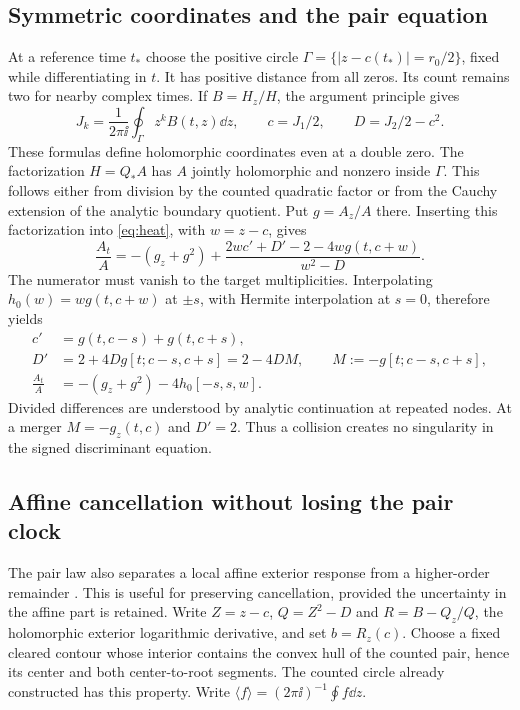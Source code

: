 \subsection{Symmetric coordinates and the pair equation}

At a reference time $t_*$ choose the positive circle
$\Gamma=\{|z-c(t_*)|=r_0/2\}$, fixed while differentiating in $t$.
It has positive distance from all zeros. Its count remains two for
nearby complex times. If $B=H_z/H$, the argument principle gives
\begin{equation}
 J_k=\frac1{2\pi\ii}\oint_\Gamma z^kB(t,z)\dd z,
 \qquad c=J_1/2,\qquad D=J_2/2-c^2.
 \label{eq:coordinates}
\end{equation}
These formulas define holomorphic coordinates even at a double zero.
The factorization $H=Q_*A$ has $A$ jointly holomorphic and nonzero
inside $\Gamma$. This follows either from division by the counted
quadratic factor or from the Cauchy extension of the analytic boundary
quotient. Put $g=A_z/A$ there. Inserting this factorization into
\eqref{eq:heat}, with $w=z-c$, gives
\begin{equation}
 \frac{A_t}{A}=-(g_z+g^2)
       +\frac{2wc'+D'-2-4wg(t,c+w)}{w^2-D}.
 \label{eq:deflated}
\end{equation}
The numerator must vanish to the target multiplicities. Interpolating
$h_0(w)=wg(t,c+w)$ at $\pm s$, with Hermite interpolation at $s=0$,
therefore yields
\begin{equation}
 \begin{split}
 c'&=g(t,c-s)+g(t,c+s),\\
 D'&=2+4Dg[t;c-s,c+s]=2-4DM,\qquad
 M:=-g[t;c-s,c+s],\\
 \frac{A_t}{A}&=-(g_z+g^2)-4h_0[-s,s,w].
 \end{split}
 \label{eq:pairlaw}
\end{equation}
Divided differences are understood by analytic continuation at repeated
nodes. At a merger $M=-g_z(t,c)$ and $D'=2$. Thus a collision creates
no singularity in the signed discriminant equation.


\subsection{Affine cancellation without losing the pair clock}
\label{pair:affine}

The pair law also separates a local affine exterior response from a
higher-order remainder \cite{BakerCM44}. This is useful for preserving
cancellation, provided the uncertainty in the affine part is retained.
Write $Z=z-c$, $Q=Z^2-D$ and
$R=B-Q_z/Q$, the holomorphic exterior logarithmic derivative, and set
$b=R_z(c)$. Choose a fixed cleared contour whose interior contains the convex hull
of the counted pair, hence its center and both center-to-root segments.
The counted circle already constructed has this property. Write $\langle f\rangle=(2\pi\ii)^{-1}\oint f\dd z$.

